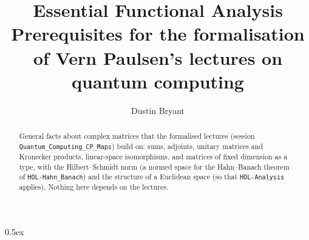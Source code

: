 \documentclass[11pt,a4paper]{article}
\begin{document}
\title{Essential Functional Analysis\\[0.5em]
  \large Prerequisites for the formalisation of Vern Paulsen's lectures on quantum computing}
\author{Dustin Bryant}
\maketitle

\begin{abstract}
General facts about complex matrices that the formalised lectures (session
\texttt{Quantum\_Computing\_CP\_Maps}) build on: sums, adjoints, unitary matrices and Kronecker
products, linear-space isomorphisms, and matrices of fixed dimension as a type, with the
Hilbert--Schmidt norm (a normed space for the Hahn--Banach theorem of \texttt{HOL-Hahn\_Banach})
and the structure of a Euclidean space (so that \texttt{HOL-Analysis} applies).  Nothing here depends on the lectures.
\end{abstract}

\tableofcontents
\newpage

\parindent 0pt\parskip 0.5ex






\end{document}
